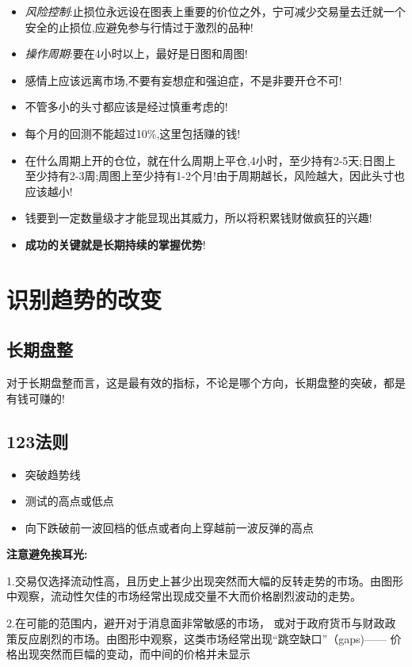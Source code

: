
\begin{itemize}

\item \textit{风险控制}:止损位永远设在图表上重要的价位之外，宁可减少交易量去迁就一个安全的止损位,应避免参与行情过于激烈的品种!
\item \textit{操作周期}:要在4小时以上，最好是日图和周图!
\item 感情上应该远离市场,不要有妄想症和强迫症，不是非要开仓不可!
\item 不管多小的头寸都应该是经过慎重考虑的!
\item 每个月的回测不能超过10\%,这里包括赚的钱!
\item 在什么周期上开的仓位，就在什么周期上平仓,4小时，至少持有2-5天;日图上至少持有2-3周;周图上至少持有1-2个月!由于周期越长，风险越大，因此头寸也应该越小!
\item 钱要到一定数量级才才能显现出其威力，所以将积累钱财做疯狂的兴趣!
\item \textbf{成功的关键就是长期持续的掌握优势}!
\end{itemize}



\section*{识别趋势的改变}


\subsection*{长期盘整}

对于长期盘整而言，这是最有效的指标，不论是哪个方向，长期盘整的突破，都是有钱可赚的!

\subsection*{123法则}

\begin{itemize}
\item 突破趋势线
\item 测试的高点或低点
\item 向下跌破前一波回档的低点或者向上穿越前一波反弹的高点
\end{itemize}

\textbf{注意避免挨耳光:}

1.交易仅选择流动性高，且历史上甚少出现突然而大幅的反转走势的市场。由图形中观察，流动性欠佳的市场经常出现成交量不大而价格剧烈波动的走势。

2.在可能的范围内，避开对于消息面非常敏感的市场， 或对于政府货币与财政政策反应剧烈的市场。由图形中观察，这类市场经常出现“跳空缺口”（gaps)—— 价格出现突然而巨幅的变动，而中间的价格并未显示

